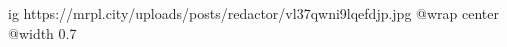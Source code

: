  
 
 
 
 

\ifcmt
  ig https://mrpl.city/uploads/posts/redactor/vl37qwni9lqefdjp.jpg
  @wrap center
  @width 0.7
\fi

